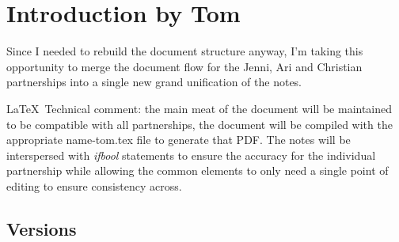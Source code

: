 \documentclass[main]{subfile}
\begin{document}
\chapter{Introduction by Tom}

Since I needed to rebuild the document structure anyway, I'm taking this opportunity to merge the document flow for the Jenni, Ari and Christian partnerships into a single new grand unification of the notes.  

\LaTeX ~Technical comment:  the main meat of the document will be maintained to be compatible with all partnerships, the document will be compiled with the appropriate name-tom.tex file to generate that PDF.  The notes will be interspersed with \textit{ifbool} statements to ensure the accuracy for the individual partnership while allowing the common elements to only need a single point of editing to ensure consistency across.

\section{Versions}

\end{document}
